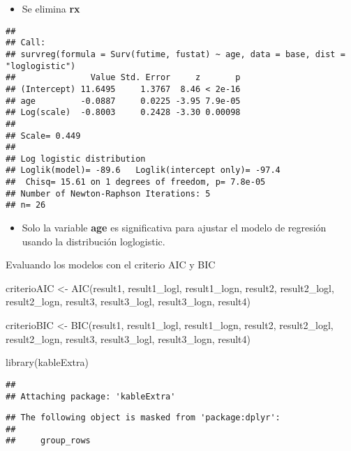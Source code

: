 \documentclass[
]{article}
\newenvironment{Shaded}{\begin{snugshade}}{\end{snugshade}}
\newcommand{\FunctionTok}[1]{\textcolor[rgb]{0.00,0.00,0.00}{#1}}
\newcommand{\NormalTok}[1]{#1}
\newcommand{\OtherTok}[1]{\textcolor[rgb]{0.56,0.35,0.01}{#1}}
\providecommand{\tightlist}{%
  \setlength{\itemsep}{0pt}\setlength{\parskip}{0pt}}
\begin{document}
\begin{itemize}
\tightlist
\item
  Se elimina \textbf{rx}
\end{itemize}

\begin{verbatim}
## 
## Call:
## survreg(formula = Surv(futime, fustat) ~ age, data = base, dist = "loglogistic")
##               Value Std. Error     z       p
## (Intercept) 11.6495     1.3767  8.46 < 2e-16
## age         -0.0887     0.0225 -3.95 7.9e-05
## Log(scale)  -0.8003     0.2428 -3.30 0.00098
## 
## Scale= 0.449 
## 
## Log logistic distribution
## Loglik(model)= -89.6   Loglik(intercept only)= -97.4
##  Chisq= 15.61 on 1 degrees of freedom, p= 7.8e-05 
## Number of Newton-Raphson Iterations: 5 
## n= 26
\end{verbatim}

\begin{itemize}
\tightlist
\item
  Solo la variable \textbf{age} es significativa para ajustar el modelo
  de regresión usando la distribución loglogistic.
\end{itemize}

Evaluando los modelos con el criterio AIC y BIC

\begin{Shaded}
\begin{Highlighting}[]
\NormalTok{criterioAIC }\OtherTok{\textless{}{-}} \FunctionTok{AIC}\NormalTok{(result1, result1\_logl, result1\_logn, result2, result2\_logl, result2\_logn, result3, result3\_logl, result3\_logn, result4)}

\NormalTok{criterioBIC }\OtherTok{\textless{}{-}} \FunctionTok{BIC}\NormalTok{(result1, result1\_logl, result1\_logn, result2, result2\_logl, result2\_logn, result3, result3\_logl, result3\_logn, result4)}
\end{Highlighting}
\end{Shaded}

\begin{Shaded}
\begin{Highlighting}[]
\FunctionTok{library}\NormalTok{(kableExtra)}
\end{Highlighting}
\end{Shaded}

\begin{verbatim}
## 
## Attaching package: 'kableExtra'
\end{verbatim}

\begin{verbatim}
## The following object is masked from 'package:dplyr':
## 
##     group_rows
\end{verbatim}
\end{document}
